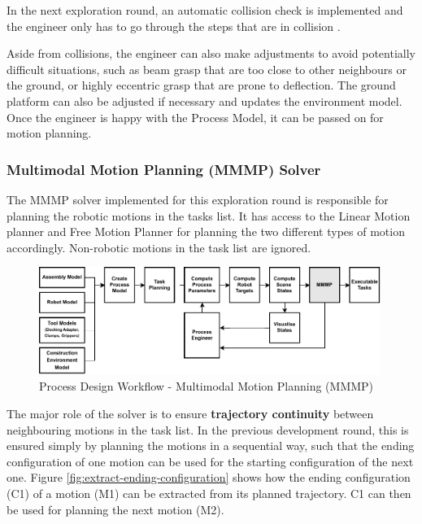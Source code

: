 In the next exploration round, an automatic collision check is implemented and the engineer only has to go through the steps that are in collision .

Aside from collisions, the engineer can also make adjustments to avoid potentially difficult situations, such as beam grasp that are too close to other neighbours or the ground, or highly eccentric grasp that are prone to deflection. The ground platform can also be adjusted if necessary and updates the environment model. Once the engineer is happy with the Process Model, it can be passed on for motion planning.

\FloatBarrier

\subsubsection{Multimodal Motion Planning (MMMP) Solver}
\label{subsubsection:exploration-3-multimodal-motion-planning-mmmp-solver}

The MMMP solver implemented for this exploration round is responsible for planning the robotic motions in the tasks list. It has access to the Linear Motion planner and Free Motion Planner for planning the two different types of motion accordingly. Non-robotic motions in the task list are ignored.

\begin{figure}[!h]
    \centering
    \includegraphics[width=0.99\textwidth]{images/6a/process_7.pdf}
    \caption{Process Design Workflow - Multimodal Motion Planning (MMMP)}
    \label{fig:process-design-7}
\end{figure}

The major role of the solver is to ensure \textbf{trajectory continuity} between neighbouring motions in the task list. In the previous development round, this is ensured simply by planning the motions in a sequential way, such that the ending configuration of one motion can be used for the starting configuration of the next one. Figure \ref{fig:extract-ending-configuration} shows how the ending configuration (C1) of a motion (M1) can be extracted from its planned trajectory. C1 can then be used for planning the next motion (M2).

